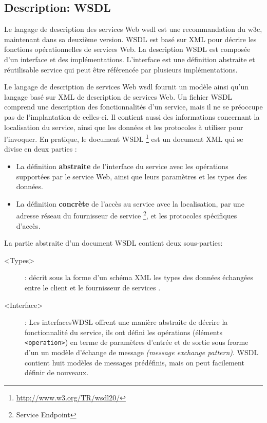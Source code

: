   \subsection{Description: WSDL}
  \label{sec:wsdl}
  Le langage de description des services Web \acrshort{wsdl}
  \cite{christensen2001web, chinnici2007web} est une recommandation du
  \acrshort{w3c}, maintenant dans sa deuxième version.  \textsc{WSDL}
  est basé sur \textsc{XML} pour décrire les fonctions opérationnelles
  de services Web. La description \textsc{WSDL} est composée d'un
  interface et des implémentations. L'interface est une définition
  abstraite et réutilisable service qui peut être référencée par
  plusieurs implémentations.

  

  Le langage de description de services Web \acrshort{wsdl}
  \cite{chinnici2007web} fournit un modèle ainsi qu'un langage basé
  sur \textsc{XML} de description de services Web. Un fichier
  \textsc{WSDL} comprend une description des fonctionnalités d'un
  service, mais il ne se préoccupe pas de l'implantation de celles-ci.
  Il contient aussi des informations concernant la localisation du
  service, ainsi que les données et les protocoles à utiliser pour
  l'invoquer. En pratique, le document \textsc{WSDL}
  \footnote{\url{http://www.w3.org/TR/wsdl20/}} est un document
  \textsc{XML} qui se divise en deux parties \cite{elie2010} :

  \SpecialItem
  \begin{itemize}
  \item La définition \textbf{abstraite} de l'interface du service
    avec les opérations supportées par le service Web, ainsi que leurs
    paramètres et les types des données.

  \item La définition \textbf{concrète} de l'accès au service avec la
    localisation, par une adresse réseau du fournisseur de service
    \footnote{Service Endpoint}, et les protocoles spécifiques
    d'accès.
  \end{itemize}

  La partie abstraite d'un document \textsc{WSDL} contient deux
  sous-parties:

  \SpecialItem
  \renewcommand{\descriptionlabel}[1]{\hspace{1.5cm}\texttt{#1}}
  \begin{description}
  \item[<Types>]: décrit sous la forme d'un schéma \textsc{XML} les
    types des données échangées entre le client et le fournisseur de
    services \cite{part20012}.

  \item[<Interface>]: Les interfaces\textsc{WDSL} offrent une manière
    abstraite de décrire la fonctionnalité du service, ils ont défini
    les opérations (éléments \texttt{<operation>}) en terme de
    paramètres d'entrée et de sortie sous frorme d'un un modèle
    d'échange de message \textit{(message exchange
      pattern)}. \textsc{WSDL} contient huit modèles de messages
    prédéfinis, mais on peut facilement définir de nouveaux.
  \end{description}

